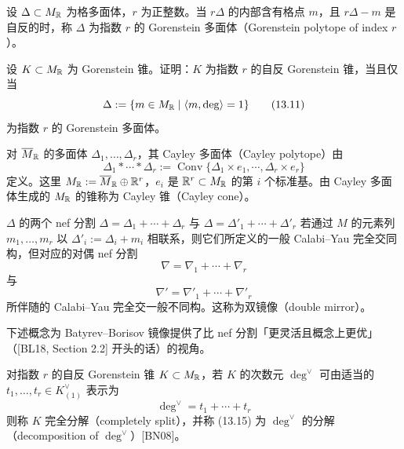 设 $\Delta\subset M_{\mathbb{R}}$ 为格多面体，$r$ 为正整数。当 $r\Delta$ 的内部含有格点 $m$，且 $r\Delta-m$ 是自反的时，称 $\Delta$ 为指数 $r$ 的 Gorenstein 多面体（Gorenstein polytope of index $r$）。

\begin{exercise}[{[BB97, Proposition 2.11]}]
设 $K\subset M_{\mathbb{R}}$ 为 Gorenstein 锥。证明：$K$ 为指数 $r$ 的自反 Gorenstein 锥，当且仅当
\begin{equation}
    \Delta:=\{m\in M_{\mathbb{R}} \mid \langle m,\deg\rangle=1\} \tag{13.11}
\end{equation}
为指数 $r$ 的 Gorenstein 多面体。
\end{exercise}

对 $\overline{M}_{\mathbb{R}}$ 的多面体 $\Delta_1,\dots,\Delta_r$，其 Cayley 多面体（Cayley polytope）由
\begin{equation}
    \Delta_1*\cdots*\Delta_r:=\operatorname{Conv}\{\Delta_1\times e_1,\cdots,\Delta_r\times e_r\} \tag{13.12}
\end{equation}
定义。这里 $M_{\mathbb{R}}:=\overline{M}_{\mathbb{R}}\oplus\mathbb{R}^r$，$e_i$ 是 $\mathbb{R}^r\subset M_{\mathbb{R}}$ 的第 $i$ 个标准基。由 Cayley 多面体生成的 $M_{\mathbb{R}}$ 的锥称为 Cayley 锥（Cayley cone）。

$\Delta$ 的两个 nef 分割 $\Delta=\Delta_1+\cdots+\Delta_r$ 与 $\Delta=\Delta'_1+\cdots+\Delta'_r$ 若通过 $M$ 的元素列 $m_1,\dots,m_r$ 以 $\Delta'_i:=\Delta_i+m_i$ 相联系，则它们所定义的一般 Calabi–Yau 完全交同构，但对应的对偶 nef 分割
\begin{equation}
    \nabla=\nabla_1+\cdots+\nabla_r \tag{13.13}
\end{equation}
与
\begin{equation}
    \nabla'=\nabla'_1+\cdots+\nabla'_r \tag{13.14}
\end{equation}
所伴随的 Calabi–Yau 完全交一般不同构。这称为双镜像（double mirror）。

下述概念为 Batyrev–Borisov 镜像提供了比 nef 分割「更灵活且概念上更优」（[BL18, Section 2.2] 开头的话）的视角。

\begin{definition}[{[BN08]}]
对指数 $r$ 的自反 Gorenstein 锥 $K\subset M_{\mathbb{R}}$，若 $K$ 的次数元 $\deg^\vee$ 可由适当的 $t_1,\dots,t_r\in K^\vee_{(1)}$ 表示为
\begin{equation}
    \deg^\vee=t_1+\cdots+t_r \tag{13.15}
\end{equation}
则称 $K$ 完全分解（completely split），并称 (13.15) 为 $\deg^\vee$ 的分解（decomposition of $\deg^\vee$）[BN08]。
\end{definition}

